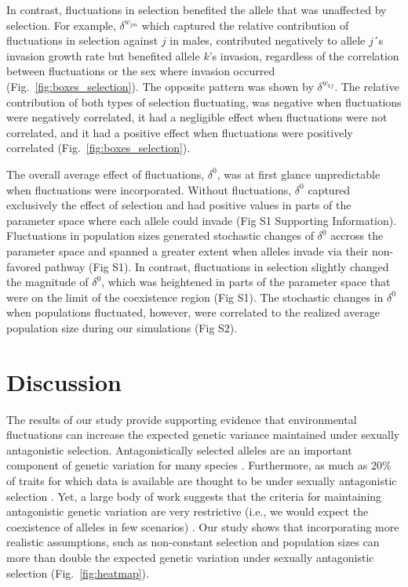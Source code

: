 \documentclass[12pt]{article}
\begin{document}
In contrast, fluctuations in selection benefited the allele that was unaffected by selection. For example, $\delta^{w_{jm}}$ which captured the relative contribution of fluctuations in selection against $j$ in males, contributed negatively to allele $j$´s invasion growth rate but benefited allele $k$'s invasion, regardless of the correlation between fluctuations or the sex where invasion occurred (Fig.~\ref{fig:boxes_selection}). The opposite pattern was shown by $\delta^{w_{kf}}$. The relative contribution of both types of selection fluctuating, was negative when fluctuations were negatively correlated, it had a negligible effect when fluctuations were not correlated, and it had a positive effect when fluctuations were positively correlated (Fig.~\ref{fig:boxes_selection}).


The overall average effect of fluctuations, $\delta^{0}$, was at first glance unpredictable when fluctuations were incorporated. Without fluctuations, $\delta^{0}$ captured exclusively the effect of selection and had positive values in parts of the parameter space where each allele could invade (Fig S1 Supporting Information). Fluctuations in population sizes generated stochastic changes of $\delta^{0}$ accross the parameter space and spanned a greater extent when alleles invade via their non-favored pathway (Fig S1). In contrast, fluctuations in selection slightly changed the magnitude of $\delta^{0}$,  which was heightened in parts of the parameter space that were on the limit of the coexistence region (Fig S1). The stochastic changes in $\delta^{0}$ when populations fluctuated, however, were correlated to the realized average population size during our simulations (Fig S2).



\section{Discussion}
The results of our study provide supporting evidence that environmental fluctuations can increase the expected genetic variance maintained under sexually antagonistic selection. Antagonistically selected alleles are an important component of genetic variation for many species \citep{foerster2007sexually,van2009intralocus,bonduriansky2009intralocus,innocenti2010sexually}. Furthermore, as much as $20\%$ of traits for which data is available are thought to be under sexually antagonistic selection \citep{morrissey2016meta}. Yet, a large body of work suggests that the criteria for maintaining antagonistic genetic variation are very restrictive (i.e., we would expect the coexistence of alleles in few scenarios) \citep{kidwell1977regions,pamilo1979genic,hedrick1999antagonistic,curtsinger1994antagonistic, patten2010fitness}. Our study shows that incorporating more realistic assumptions, such as non-constant selection and population sizes can more than double the expected genetic variation under sexually antagonistic selection (Fig.~\ref{fig:heatmap}).
\end{document}
